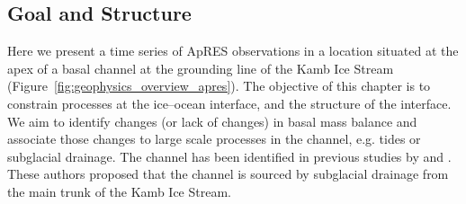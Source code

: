 
\subsection{Goal and Structure}
Here we present a time series of ApRES observations in a location situated at the apex of a basal channel at the grounding line of the Kamb Ice Stream (Figure~\ref{fig:geophysics_overview_apres}).  The objective of this chapter is to constrain processes at the ice--ocean interface, and the structure of the interface. We aim to identify changes (or lack of changes) in basal mass balance and associate those changes to large scale processes in the channel, e.g. tides or subglacial drainage.
 The channel has been identified in previous studies by \cite{alley2016impacts,kim2016active,goeller2015subglacial,le2009subglacial} and \cite{horgan2017poststagnation}. These authors proposed that the channel is sourced by subglacial drainage from the main trunk of the Kamb Ice Stream. 

